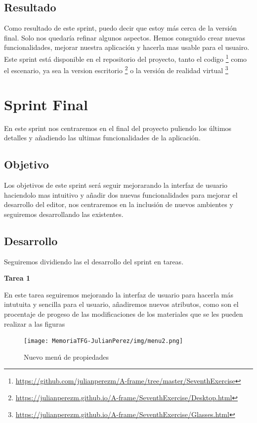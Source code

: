 \documentclass[a4paper, 12pt]{book}
\begin{document}
\subsection{Resultado}

Como resultado de este sprint, puedo decir que estoy más cerca de la versión final. Solo nos quedaría refinar algunos aspectos. Hemos consguido crear nuevas funcionalidades, mejorar nuestra aplicación y hacerla mas usable para el usuairo. Este sprint está disponible en el repositorio del proyecto, tanto el codigo \footnote{\url{https://github.com/julianperezm/A-frame/tree/master/SeventhExercise}} como el escenario, ya sea la version escritorio \footnote{\url{https://julianperezm.github.io/A-frame/SeventhExercise/Desktop.html}} o la versión de realidad virtual \footnote{\url{https://julianperezm.github.io/A-frame/SeventhExercise/Glasses.html}}

\section{Sprint Final}
En este sprint nos centraremos en el final del proyecto puliendo los últimos detalles y añadiendo las ultimas funcionalidades de la aplicación.

\subsection{Objetivo}
Los objetivos de este sprint será seguir mejorarando la interfaz de usuario haciendolo mas intuitivo y añadir dos nuevas funcionalidades para mejorar el desarrollo del editor, nos centraremos en la inclusión de nuevos ambientes y seguiremos desarrollando las existentes.

\subsection{Desarrollo}
Seguiremos dividiendo las el desarrollo del sprint en tareas.

\textbf{Tarea 1}

En este tarea seguiremos mejorando la interfaz de usuario para hacerla más intutuita y sencilla para el usuario, añadiremos nuevos atributos, como son el procentaje de progeso de las modificaciones de los materiales que se les pueden realizar a las figuras 

\begin{figure}[H]
  \centering
  \texttt{[image: MemoriaTFG-JulianPerez/img/menu2.png]}
  \caption{Nuevo menú de propiedades}\label{menu2}
\end{figure}
\end{document}
